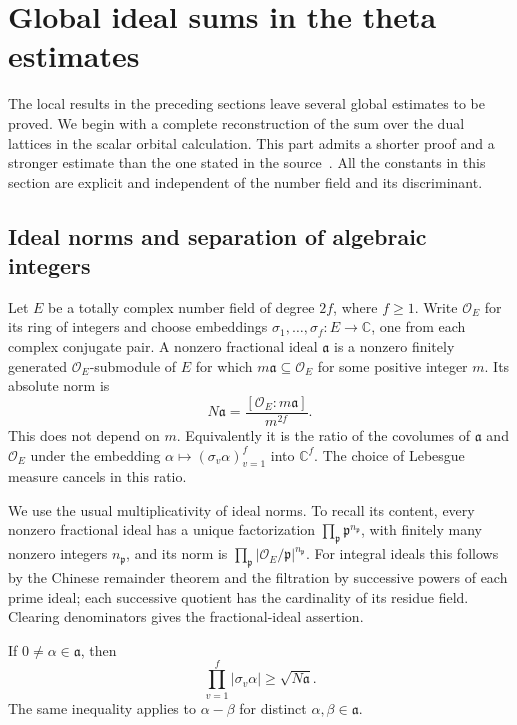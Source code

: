 \section{Global ideal sums in the theta estimates}
\label{gt-section}

The local results in the preceding sections leave several global
estimates to be proved.  We begin with a complete reconstruction of the
sum over the dual lattices in the scalar orbital calculation.  This
part admits a shorter proof and a stronger estimate than the one
stated in the source~\cite{alpo-uniform-source}.  All the constants in this section are explicit
and independent of the number field and its discriminant.

\subsection{Ideal norms and separation of algebraic integers}

Let $E$ be a totally complex number field of degree $2f$, where $f\geq1$.
Write $\mathcal O_E$ for its ring of integers and choose embeddings
$\sigma_1,\ldots,\sigma_f:E\longrightarrow\mathbb C$, one from each
complex conjugate pair.  A nonzero fractional ideal $\mathfrak a$ is a
nonzero finitely generated $\mathcal O_E$-submodule of $E$ for which
$m\mathfrak a\subseteq\mathcal O_E$ for some positive integer $m$.
Its absolute norm is
\[
 N\mathfrak a=\frac{[\mathcal O_E:m\mathfrak a]}{m^{2f}}.
\]
This does not depend on $m$.  Equivalently it is the ratio of the
covolumes of $\mathfrak a$ and $\mathcal O_E$ under the embedding
$\alpha\mapsto(\sigma_v\alpha)_{v=1}^f$ into $\mathbb C^f$.
The choice of Lebesgue measure cancels in this ratio.

We use the usual multiplicativity of ideal norms.  To recall its
content, every nonzero fractional ideal has a unique factorization
$\prod_{\mathfrak p}\mathfrak p^{n_{\mathfrak p}}$, with finitely many
nonzero integers $n_{\mathfrak p}$, and its norm is
$\prod_{\mathfrak p}|\mathcal O_E/\mathfrak p|^{n_{\mathfrak p}}$.
For integral ideals this follows by the Chinese remainder theorem
and the filtration by successive powers of each prime ideal; each
successive quotient has the cardinality of its residue field.
Clearing denominators gives the fractional-ideal assertion.

\begin{lemma}\label{gt-product-minimum}
If $0\ne\alpha\in\mathfrak a$, then
\begin{equation}\label{gt-product-minimum-eq}
 \prod_{v=1}^f|\sigma_v\alpha|\geq\sqrt{N\mathfrak a}.
\end{equation}
The same inequality applies to $\alpha-\beta$ for distinct
$\alpha,\beta\in\mathfrak a$.
\end{lemma}

